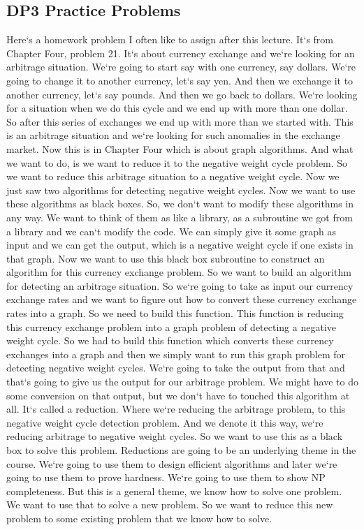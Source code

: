 \subsection{DP3  Practice Problems}
Here`s a homework problem I often like to assign after this lecture.
It`s from Chapter Four, problem 21.
It`s about currency exchange and we`re looking for an arbitrage situation.
We`re going to start say with one currency, say dollars.
We`re going to change it to another currency, let`s say yen.
And then we exchange it to another currency, let`s say pounds.
And then we go back to dollars.
We`re looking for a situation when we do this cycle and we end up with more than one dollar.
So after this series of exchanges we end up with more than we started with.
This is an arbitrage situation and we`re looking for such anomalies in the exchange market.
Now this is in Chapter Four which is about graph algorithms.
And what we want to do, is we want to reduce it to the negative weight cycle problem.
So we want to reduce this arbitrage situation to a negative weight cycle.
Now we just saw two algorithms for detecting negative weight cycles.
Now we want to use these algorithms as black boxes.
So, we don`t want to modify these algorithms in any way.
We want to think of them as like a library, as a subroutine we got from a library and we can`t modify the code.
We can simply give it some graph as input and we can get the output, which is a negative weight cycle if one exists in that graph.
Now we want to use this black box subroutine to construct an algorithm for this currency exchange problem.
So we want to build an algorithm for detecting an arbitrage situation.
So we`re going to take as input our currency exchange rates and we want to figure out how to convert these currency exchange rates into a graph.
So we need to build this function.
This function is reducing this currency exchange problem into a graph problem of detecting a negative weight cycle.
So we had to build this function which converts these currency exchanges into a graph and then we simply want to run this graph problem for detecting negative weight cycles.
We`re going to take the output from that and that`s going to give us the output for our arbitrage problem.
We might have to do some conversion on that output, but we don`t have to touched this algorithm at all.
It`s called a reduction.
Where we`re reducing the arbitrage problem, to this negative weight cycle detection problem.
And we denote it this way, we`re reducing arbitrage to negative weight cycles.
So we want to use this as a black box to solve this problem.
Reductions are going to be an underlying theme in the course.
We`re going to use them to design efficient algorithms and later we`re going to use them to prove hardness.
We`re going to use them to show NP completeness.
But this is a general theme, we know how to solve one problem.
We want to use that to solve a new problem.
So we want to reduce this new problem to some existing problem that we know how to solve.

